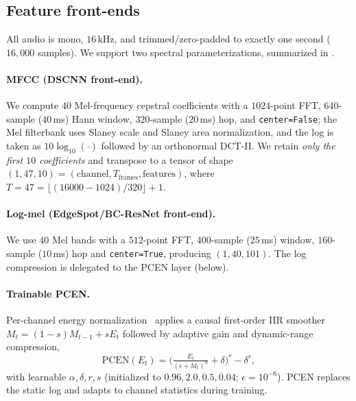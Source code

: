 \documentclass[10pt,twocolumn]{article}
\newcommand{\code}[1]{\texttt{\small #1}}
\begin{document}
\subsection{Feature front-ends}\label{sec:features}

All audio is mono, $16$\,kHz, and trimmed/zero-padded to exactly one second
($16{,}000$ samples). We support two spectral parameterizations, summarized in
.

\paragraph{MFCC (DSCNN front-end).}
We compute $40$ Mel-frequency cepstral coefficients with a $1024$-point FFT,
$640$-sample ($40$\,ms) Hann window, $320$-sample ($20$\,ms) hop, and
\code{center=False}; the Mel filterbank uses Slaney scale and Slaney area
normalization, and the log is taken as $10\log_{10}(\cdot)$ followed by an
orthonormal DCT-II. We retain \emph{only the first $10$ coefficients} and
transpose to a tensor of shape $(1,47,10)=(\text{channel},T_{\text{frames}},
\text{features})$, where $T=47=\lfloor (16000-1024)/320\rfloor+1$.

\paragraph{Log-mel (EdgeSpot/BC-ResNet front-end).}
We use $40$ Mel bands with a $512$-point FFT, $400$-sample ($25$\,ms) window,
$160$-sample ($10$\,ms) hop and \code{center=True}, producing $(1,40,101)$. The
log compression is delegated to the PCEN layer (below).

\paragraph{Trainable PCEN.}
Per-channel energy normalization~\cite{wang2017trainable} applies a causal
first-order IIR smoother $M_t=(1-s)M_{t-1}+sE_t$ followed by adaptive gain and
dynamic-range compression,
\begin{equation}
\text{PCEN}(E_t)=\Big(\tfrac{E_t}{(\epsilon+M_t)^{\alpha}}+\delta\Big)^{r}-\delta^{r},
\label{eq:pcen}
\end{equation}
with learnable $\alpha,\delta,r,s$ (initialized to $0.96, 2.0, 0.5, 0.04$;
$\epsilon{=}10^{-6}$). PCEN replaces the static log and adapts to channel
statistics during training.
\end{document}
